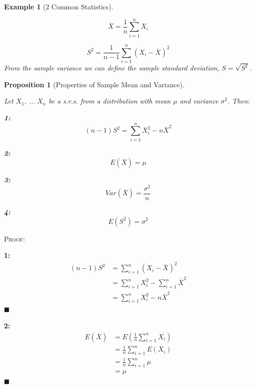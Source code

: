 \documentclass[12pt,a4paper]{article}
\newtheorem{ex}[thm]{Example}
\newtheorem{prop}[thm]{Proposition}
\begin{document}
\begin{ex}[2 Common Statistics]$\;$\par\vspace{1cm}

$$\overline{X} = \frac{1}{n} \sum_{i=1}^n X_i$$

$$S^2 = \frac{1}{n-1}\sum_{i=1}^n (X_i - \overline{X})^2$$
From the sample variance we can define the sample standard deviation, $S=\sqrt{S^2}$.

\end{ex}

\begin{prop}[Properties of Sample Mean and Variance]\label{sample moments}$\;$\par\vspace{1cm}

Let $X_1,\;\hdots\; X_n$ be a s.r.s. from a distribution with mean $\mu$ and variance $\sigma^2$. Then:

{\bf 1: }
$$(n-1)S^2 = \sum_{i=1}^n X_i^2 - n\overline{X}^2$$

{\bf 2:}
$$E(\overline{X}) = \mu$$

{\bf 3:}
$$Var(\overline{X}) = \frac{\sigma^2}{n}$$

{\bf 4:}
$$E(S^2) = \sigma^2$$

\end{prop}

\noindent\textsc{Proof:}\par\vspace{1cm}

{\bf 1: }
\begin{align*}
(n-1)S^2 &= \sum_{i=1}^n (X_i-\overline{X})^2\\
&= \sum_{i=1}^n X_i^2 - \sum_{i=1}^n \overline{X}^2\\
&= \sum_{i=1}^n X_i^2 - n\overline{X}^2
\end{align*}\hfill$\blacksquare$

{\bf 2:}
\begin{align*}
E(\overline{X}) &= E(\frac{1}{n}\sum_{i=1}^n X_i)\\
&= \frac{1}{n}\sum_{i=1}^n E(X_i)\\
&= \frac{1}{n} \sum_{i=1}^n \mu\\
&= \mu
\end{align*}\hfill$\blacksquare$
\end{document}

